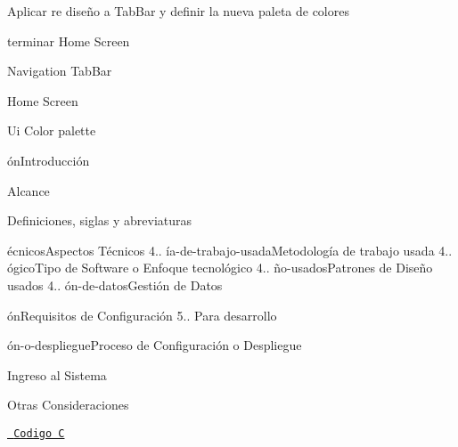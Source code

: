 
\begin{DoxyItemize}
\item Aplicar re diseño a Tab\+Bar y definir la nueva paleta de colores
\end{DoxyItemize}

terminar Home Screen

Navigation Tab\+Bar

Home Screen

Ui Color palette


\begin{DoxyEnumerate}
\item ónIntroducción
\item Alcance
\item Definiciones, siglas y abreviaturas
\item écnicosAspectos Técnicos 4.. ía-\/de-\/trabajo-\/usadaMetodología de trabajo usada 4.. ógicoTipo de Software o Enfoque tecnológico 4.. ño-\/usadosPatrones de Diseño usados 4.. ón-\/de-\/datosGestión de Datos
\item ónRequisitos de Configuración 5.. Para desarrollo
\item ón-\/o-\/despliegueProceso de Configuración o Despliegue
\item Ingreso al Sistema
\item Otras Consideraciones
\end{DoxyEnumerate}

\href{file:///home/franky/Proyects/Trabajos-Universidad-Codigo-UDG/2semPE/c/src/Condicionales/Selectiva-Doble-anidada-calif.c}{\texttt{ Codigo C}} 